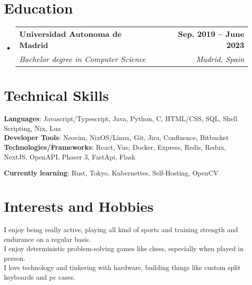 \documentclass[letterpaper,11pt]{article}
\makeatletter
\newcommand{\resumeSubheading}[4]{
  \vspace{-2pt}\item
    \begin{tabular*}{1.0\textwidth}[t]{l@{\extracolsep{\fill}}r}
      \textbf{#1} & \textbf{\small #2} \\
      \textit{\small#3} & \textit{\small #4} \\
    \end{tabular*}\vspace{-7pt}
}
\newcommand{\resumeSubHeadingListStart}{\begin{itemize}[leftmargin=0.0in, label={}]}
\newcommand{\resumeSubHeadingListEnd}{\end{itemize}}
\makeatother
\begin{document}
\section{\Large Education}
  \resumeSubHeadingListStart
    \resumeSubheading
      {Universidad Autonoma de Madrid}{Sep. 2019 -- June 2023}
      {Bachelor degree in Computer Science}{Madrid, Spain}
  \resumeSubHeadingListEnd\vspace{-4pt}

\section{\Large Technical Skills}
 \begin{itemize}[leftmargin=0.15in, label={}]
    \small{\item{
     \textbf{Languages}{: Javascript/Typescript, Java, Python, C, HTML/CSS, SQL, Shell Scripting, Nix, Lua} \\
     \textbf{Developer Tools}{: Neovim, NixOS/Linux, Git, Jira, Confluence, Bitbucket} \\
     \textbf{Technologies/Frameworks}{: React, Vue, Docker, Express, Redis, Redux, NextJS, OpenAPI, Phaser 3, FastApi, Flask} \\
    }}
     \textbf{Currently learning}{: Rust, Tokyo, Kubernettes, Self-Hosting, OpenCV} \\
 \end{itemize}
 \vspace{-10pt}


 \section{\Large Interests and Hobbies}
  \faDumbbell\hspace{1pt} I enjoy being really active, playing all kind of sports and training strength and endurance on a regular basis.\\
  \hspace{3pt}\faChessKnight\hspace{3pt} I enjoy deterministic problem-solving games like chess, especially when played in person.\\
  \faMicrochip\hspace{3pt} I love technology and tinkering with hardware, building things like custom split keyboards and pc cases.
\end{document}
